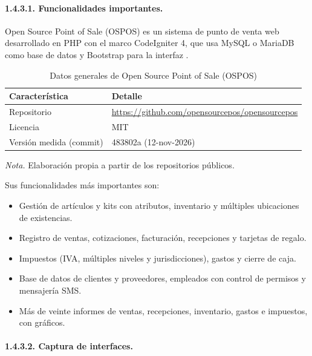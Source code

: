 \paragraph{1.4.3.1. Funcionalidades importantes.}

Open Source Point of Sale (OSPOS) es un sistema de punto de venta web desarrollado en PHP con el marco CodeIgniter 4, que usa MySQL o MariaDB como base de datos y Bootstrap para la interfaz \parencite{opensourcepos2026}.

\begin{table}[H]
\caption{Datos generales de Open Source Point of Sale (OSPOS)}
\label{tab:ref3_datos}
\begin{threeparttable}
\begin{tabular}{>{\raggedright\arraybackslash}p{6.2cm} >{\raggedright\arraybackslash}p{6.8cm}}
\toprule
Característica & Detalle \\
\midrule
Repositorio & \url{https://github.com/opensourcepos/opensourcepos} \\
Licencia & MIT \\
Versión medida (commit) & 483802a (12-nov-2026) \\
\bottomrule
\end{tabular}
\begin{tablenotes}
\item \textit{Nota.} Elaboración propia a partir de los repositorios públicos.
\end{tablenotes}
\end{threeparttable}
\end{table}

Sus funcionalidades más importantes son:

\begin{itemize}
    \item Gestión de artículos y kits con atributos, inventario y múltiples ubicaciones de existencias.
    \item Registro de ventas, cotizaciones, facturación, recepciones y tarjetas de regalo.
    \item Impuestos (IVA, múltiples niveles y jurisdicciones), gastos y cierre de caja.
    \item Base de datos de clientes y proveedores, empleados con control de permisos y mensajería SMS.
    \item Más de veinte informes de ventas, recepciones, inventario, gastos e impuestos, con gráficos.
\end{itemize}

\paragraph{1.4.3.2. Captura de interfaces.}

